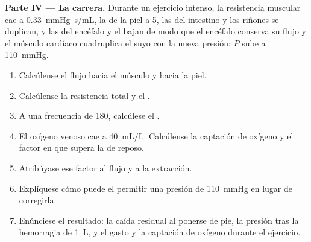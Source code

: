 \begin{problem}
\medskip
\noindent\textbf{Parte IV --- La carrera.}
Durante un ejercicio intenso, la resistencia muscular cae a
\qty{0.33}{mmHg.s/mL}, la de la piel a 5, las del intestino y los riñones
se duplican, y las del encéfalo y el  bajan de modo que el encéfalo
conserva su flujo y el músculo cardíaco cuadruplica el suyo con la nueva
presión; $\bar P$ sube a \qty{110}{mmHg}.
\begin{enumerate}[resume]
  \item Calcúlense el flujo hacia el músculo y hacia la piel.
  \item Calcúlense la resistencia total y el .
  \item A una frecuencia de 180, calcúlese el .
  \item El oxígeno venoso cae a \qty{40}{mL/L}. Calcúlense la captación de
        oxígeno y el factor en que supera la de reposo.
  \item Atribúyase ese factor al flujo y a la extracción.
  \item Explíquese cómo puede el  permitir una presión de
        \qty{110}{mmHg} en lugar de corregirla.
  \item Enúnciese el resultado: la caída residual al ponerse de pie, la
        presión tras la hemorragia de \qty{1}{L}, y el gasto y la captación
        de oxígeno durante el ejercicio.
\end{enumerate}
\end{problem}
